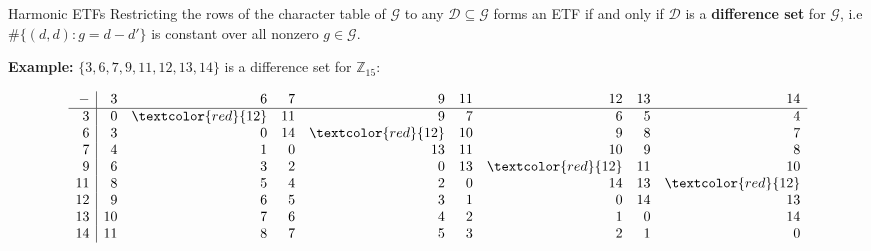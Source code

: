 \documentclass[12pt]{beamer}
\newcommand{\bbZ}{\mathbb{Z}}
\newcommand{\calD}{\mathcal{D}}
\newcommand{\calG}{\mathcal{G}}
\begin{document}
\begin{frame}[noframenumbering]{Harmonic ETFs}
Restricting the rows of the character table of $\calG$ to any $\calD\subseteq\calG$ forms an ETF if and only if $\calD$ is a \textbf{difference set} for $\calG$, i.e $\#\{(d,d):g=d-d'\}$ is constant over all nonzero $g\in\calG$.

\vfill

\textbf{Example:}
$\{3,6,7,9,11,12,13,14\}$ is a difference set for $\bbZ_{15}$:

\footnotesize{
\begin{equation*}
\begin{array}{r|rrrrrrrr}
 -& 3& 6&7 & 9&11&12&13&14\\\hline
 3& 0& \textcolor{red}{12} &11& 9& 7& 6& 5& 4\\
 6& 3& 0&14&\textcolor{red}{12}&10& 9& 8& 7\\
 7& 4& 1& 0&13&11&10& 9& 8\\
 9& 6& 3& 2& 0&13&\textcolor{red}{12}&11&10\\
11& 8& 5& 4& 2& 0&14&13&\textcolor{red}{12}\\
12& 9& 6& 5& 3& 1& 0&14&13\\
13&10& 7& 6& 4& 2& 1& 0&14\\
14&11& 8& 7& 5& 3& 2& 1& 0
\end{array}
\end{equation*}
}

\end{frame}
\end{document}
